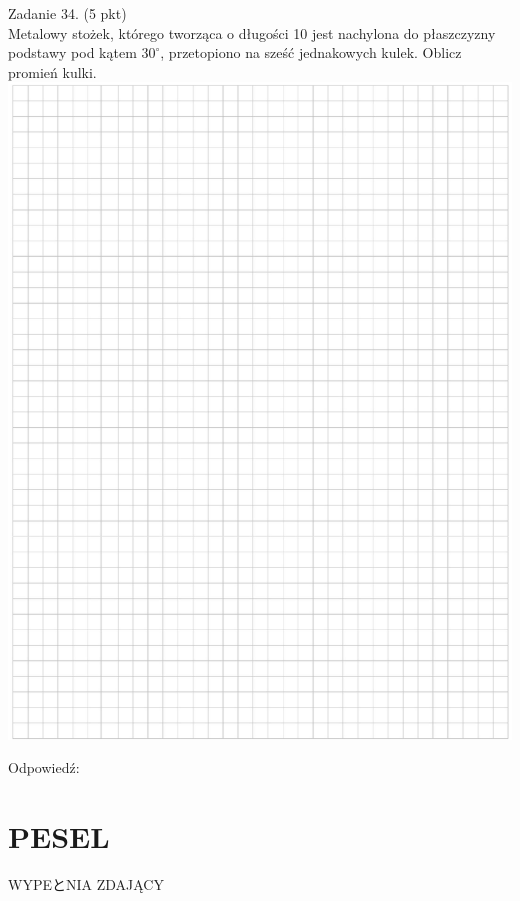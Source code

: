 \documentclass[10pt]{article}
\begin{document}
Zadanie 34. (5 pkt)\\
Metalowy stożek, którego tworząca o długości 10 jest nachylona do płaszczyzny podstawy pod kątem \(30^{\circ}\), przetopiono na sześć jednakowych kulek. Oblicz promień kulki.\\
\includegraphics[max width=\textwidth, center]{2024_11_21_9a9f600c3b3af5013d80g-15}

Odpowiedź:

\section*{PESEL}
WYPEとNIA ZDAJĄCY
\end{document}
